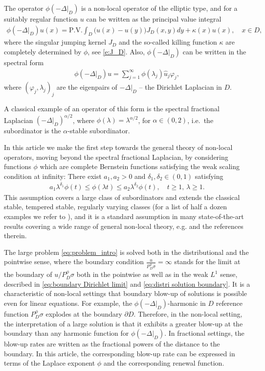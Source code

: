 \documentclass[12pt,a4paper,onecolumn]{amsart}
\theoremstyle{definition}
\newcommand{\1}{\mathbf 1}
\newcommand{\Lo}{\phi(-\left.\Delta\right\vert_{D})}
\newcommand{\PDfi}{P^\phi_{ D}}
\newcommand{\PDFI}{\PDfi}
\newcommand{\wh}{\widehat}
\numberwithin{equation}{section}
\begin{document}
The operator $\Lo$ is a non-local operator of the elliptic type, and for a suitably regular function $u$ can be written as the principal value integral
\begin{align*}
    \Lo u(x)=\textrm{P.V.}\int_D\big(u(x)-u(y)\big)J_D(x,y)dy+\kappa(x)u(x), \quad x \in D,
\end{align*}
where the singular jumping kernel $J_D$ and the so-called killing function $\kappa$ are completely determined by $\phi$, see \eqref{e:J_D}. Also, $\Lo$ can be written in the spectral form 
\begin{align*}
    \Lo u=\sum_{j=1}^\infty \phi(\lambda_j)\wh u_j\varphi_j,
\end{align*}
where $(\varphi_j,\lambda_j)_j$ are the eigenpairs of  $-\left.\Delta\right\vert_{D}$ -- the Dirichlet Laplacian in $D$. 

A classical example of an operator of this form is the spectral fractional Laplacian $(-\left.\Delta\right\vert_{D})^{\alpha/2}$, where $\phi(\lambda)=\lambda^{\alpha/2}$, for $\alpha\in(0,2)$, i.e.~the subordinator is the $\alpha$-stable subordinator.

In this article we make the first step towards the general theory of non-local operators, moving beyond the spectral fractional Laplacian, by considering functions $\phi$ which are complete Bernstein functions satisfying the weak scaling condition at infinity: There exist $a_1,a_2>0$ and $\delta_1, \delta_2  \in(0,1)$ satisfying
\begin{align*}\label{WSC_intro}
a_1\lambda^{\delta_1}\phi(t)\le \phi(\lambda t)\le a_2\lambda^{\delta_2}\phi(t),\quad t\ge1, \,\lambda\ge 1.\tag{WSC}
\end{align*}
This assumption covers a large class of subordinators and extends the classical stable, tempered stable, regularly varying classes (for a list of half a dozen examples we refer to \cite[p. 41]{vondra_heat}), and it is a standard assumption in many state-of-the-art results covering a wide range of general non-local theory, e.g. \cite{semilinear_bvw,BL-na21,BMS23,CKKW22,CKSV22,GKK20,KSV-jde23} and the references therein.

The large problem \eqref{eq:problem_intro} is solved both in the distributional and the pointwise sense, where the boundary condition $\frac{u}{\PDFI\sigma}=\infty$ stands for the limit at the boundary of $u/\PDFI\sigma$ both in the pointwise as well as in the weak $L^1$ sense, described in \eqref{eq:boundary Dirichlet limit} and \eqref{eq:distri solution boundary}. It is a characteristic of non-local settings that boundary blow-up of solutions is possible even for linear equations. For example, the $\Lo$-harmonic in $D$ reference function $\PDFI\sigma$ explodes at the boundary $\partial D$. Therefore, in the non-local setting, the interpretation of a large solution is that it exhibits a greater blow-up at the boundary than any harmonic function for $\Lo$. In fractional settings, the blow-up rates are written as the fractional powers of the distance to the boundary. In this article, the corresponding blow-up rate can be expressed in terms of the Laplace exponent $\phi$ and the corresponding renewal function.
\end{document}
